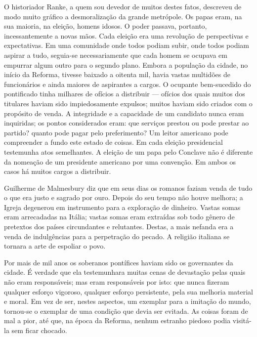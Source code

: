 \documentclass[11pt,a5paper,twoside,openany]{book}
\begin{document}
O historiador Ranke, a quem sou devedor de muitos destes fatos, descreveu de modo muito gráfico a desmoralização da grande metrópole. Os papas eram, na sua maioria, na eleição, homens idosos. O poder passava, portanto, incessantemente a novas mãos. Cada eleição era uma revolução de perspectivas e expectativas. Em uma comunidade onde todos podiam subir, onde todos podiam aspirar a tudo, seguia-se necessariamente que cada homem se ocupava em empurrar algum outro para o segundo plano. Embora a população da cidade, no início da Reforma, tivesse baixado a oitenta mil, havia vastas multidões de funcionários e ainda maiores de aspirantes a cargos. O ocupante bem-sucedido do pontificado tinha milhares de ofícios a distribuir — ofícios dos quais muitos dos titulares haviam sido impiedosamente expulsos; muitos haviam sido criados com o propósito de venda. A integridade e a capacidade de um candidato nunca eram inquiridas; os pontos considerados eram: que serviços prestou ou pode prestar ao partido? quanto pode pagar pelo preferimento? Um leitor americano pode compreender a fundo este estado de coisas. Em cada eleição presidencial testemunha atos semelhantes. A eleição de um papa pelo Conclave não é diferente da nomeação de um presidente americano por uma convenção. Em ambos os casos há muitos cargos a distribuir.

Guilherme de Malmesbury diz que em seus dias os romanos faziam venda de tudo o que era justo e sagrado por ouro. Depois do seu tempo não houve melhora; a Igreja degenerou em instrumento para a exploração de dinheiro. Vastas somas eram arrecadadas na Itália; vastas somas eram extraídas sob todo gênero de pretextos dos países circundantes e relutantes. Destas, a mais nefanda era a venda de indulgências para a perpetração do pecado. A religião italiana se tornara a arte de espoliar o povo.

Por mais de mil anos os soberanos pontífices haviam sido os governantes da cidade. É verdade que ela testemunhara muitas cenas de devastação pelas quais não eram responsáveis; mas eram responsáveis por isto: que nunca fizeram qualquer esforço vigoroso, qualquer esforço persistente, pela sua melhoria material e moral. Em vez de ser, nestes aspectos, um exemplar para a imitação do mundo, tornou-se o exemplar de uma condição que devia ser evitada. As coisas foram de mal a pior, até que, na época da Reforma, nenhum estranho piedoso podia visitá-la sem ficar chocado.
\end{document}
